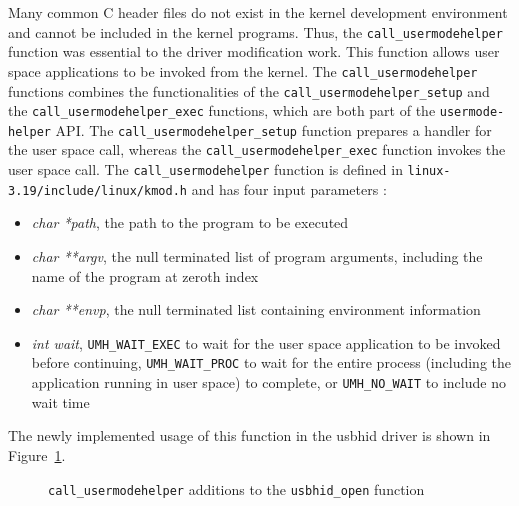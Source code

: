 \documentclass[pagenumbers]{ieee}
\begin{document}
Many common C header files do not exist in the kernel development environment and cannot be included in the kernel programs. Thus, the \texttt{call\_usermodehelper} function was essential to the driver modification work. This function allows user space applications to be invoked from the kernel. The \texttt{call\_usermodehelper} functions combines the functionalities of the \texttt{call\_usermodehelper\_setup} and the \texttt{call\_usermodehelper\_exec} functions, which are both part of the \texttt{usermode-helper} API. The \texttt{call\_usermodehelper\_setup} function prepares a handler for the user space call, whereas the \texttt{call\_usermodehelper\_exec} function invokes the user space call. The \texttt{call\_usermodehelper} function is defined in \texttt{linux-3.19/include/linux/kmod.h} and has four input parameters \cite{ibm}:
\begin{itemize}
\item \textit{char *path}, the path to the program to be executed
\item \textit{char **argv}, the null terminated list of program arguments, including the name of the program at zeroth index
\item \textit{char **envp}, the null terminated list containing environment information 
\item \textit{int wait}, \texttt{UMH\_WAIT\_EXEC} to wait for the user space application to be invoked before continuing, \texttt{UMH\_WAIT\_PROC} to wait for the entire process (including the application running in user space) to complete, or \texttt{UMH\_NO\_WAIT} to include no wait time
\end{itemize}

The newly implemented usage of this function in the usbhid driver is shown in Figure~\ref{fig:usermodehelper_code}.

\begin{figure}[H]
   \caption{\texttt{call\_usermodehelper} additions to the \texttt{usbhid\_open} function}
   \label{fig:usermodehelper_code}
\end{figure}
\end{document}
